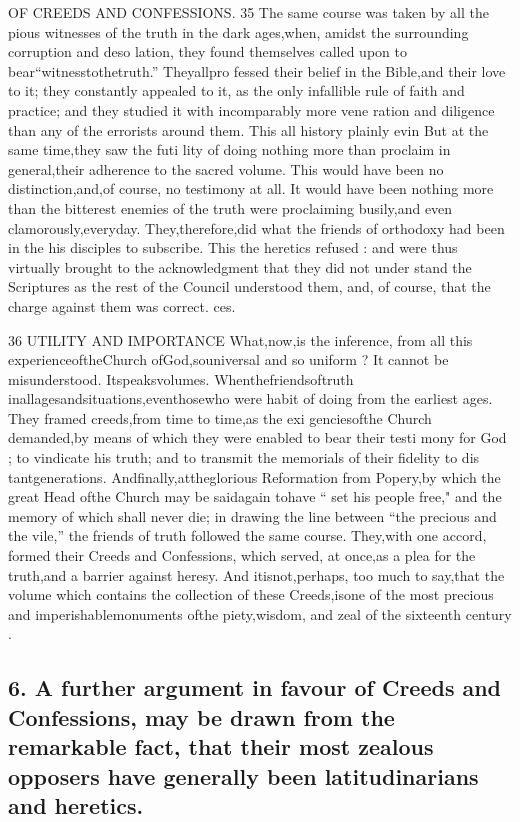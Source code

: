 \documentclass[
]{book}
\begin{document}
OF CREEDS AND CONFESSIONS. 35
The same course was taken by all the pious witnesses of the truth in the dark ages,when,
amidst the surrounding corruption and deso
lation, they found themselves called upon to bear``witnesstothetruth.'' Theyallpro
fessed their belief in the Bible,and their love to it; they constantly appealed to it, as the only infallible rule of faith and practice; and they studied it with incomparably more vene ration and diligence than any of the errorists around them. This all history plainly evin
But at the same time,they saw the futi lity of doing nothing more than proclaim in general,their adherence to the sacred volume. This would have been no distinction,and,of course, no testimony at all. It would have been nothing more than the bitterest enemies
of the truth were proclaiming busily,and even clamorously,everyday. They,therefore,did
what the friends of orthodoxy had been in the
his disciples to subscribe. This the heretics
refused : and were thus virtually brought to
the acknowledgment that they did not under stand the Scriptures as the rest of the Council understood them, and, of course, that the charge against them was correct.
ces.

36 UTILITY AND IMPORTANCE
What,now,is the inference, from all this experienceoftheChurch ofGod,souniversal and so uniform ? It cannot be misunderstood.
Itspeaksvolumes. Whenthefriendsoftruth inallagesandsituations,eventhosewho were
habit of doing from the earliest ages. They framed creeds,from time to time,as the exi
genciesofthe Church demanded,by means of which they were enabled to bear their testi mony for God ; to vindicate his truth; and to transmit the memorials of their fidelity to dis tantgenerations. Andfinally,attheglorious Reformation from Popery,by which the great Head ofthe Church may be saidagain tohave
`` set his people free," and the memory of
which shall never die; in drawing the line between ``the precious and the vile,'' the friends of truth followed the same course.
They,with one accord, formed their Creeds
and Confessions, which served, at once,as a
plea for the truth,and a barrier against heresy.
And itisnot,perhaps, too much to say,that the volume which contains the collection of
these Creeds,isone of the most precious and
imperishablemonuments ofthe piety,wisdom, and zeal of the sixteenth century .

\hypertarget{a-further-argument-in-favour-of-creeds-and-confessions-may-be-drawn-from-the-remarkable-fact-that-their-most-zealous-opposers-have-generally-been-latitudinarians-and-heretics.}{%
\subsection{6. A further argument in favour of Creeds and Confessions, may be drawn from the remarkable fact, that their most zealous opposers have generally been latitudinarians and heretics.}\label{a-further-argument-in-favour-of-creeds-and-confessions-may-be-drawn-from-the-remarkable-fact-that-their-most-zealous-opposers-have-generally-been-latitudinarians-and-heretics.}}
\end{document}
